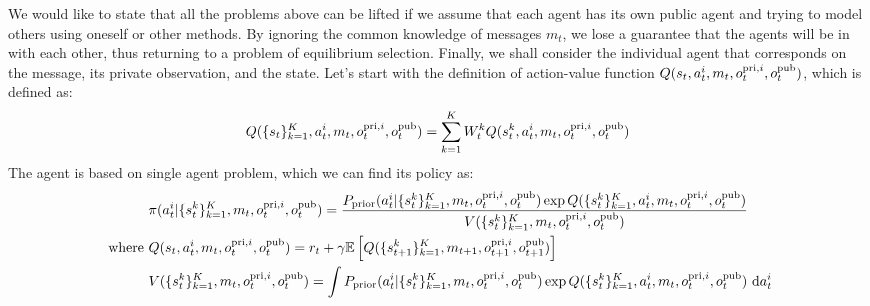 We would like to state that all the problems above can be lifted if we assume that each agent has its own public agent and trying to model others using oneself or other methods. By ignoring the common knowledge of messages $m_t$, we lose a guarantee that the agents will be in  with each other, thus returning to a problem of equilibrium selection. Finally, we shall consider the individual agent that corresponds on the message, its private observation, and the state. Let's start with the definition of action-value function $Q(s_t, a^i_t, m_t, o^{\operatorname{pri}, i}_t, o^{\operatorname{pub}}_t)$, which is defined as:
\begin{equation}
    Q(\{s_t\}^K_{k=1}, a^i_t, m_t, o^{\operatorname{pri}, i}_t, o^{\operatorname{pub}}_t) = \sum^K_{k=1} W^k_t Q(s_t^k, a^i_t, m_t, o^{\operatorname{pri}, i}_t, o^{\operatorname{pub}}_t)
\end{equation}
The agent is based on single agent problem, which we can find its policy as:
\begin{equation}
\begin{aligned}
    &\pi(a^i_t | \{s_t^k\}^K_{k=1}, m_t, o^{\operatorname{pri}, i}_t, o^{\operatorname{pub}}_t) = \frac{P_{\text{prior}}(a^i_t | \{s_t^k\}^K_{k=1}, m_t, o^{\operatorname{pri}, i}_t, o^{\operatorname{pub}}_t)\exp{Q(\{s_t^k\}^K_{k=1}, a^i_t, m_t, o^{\operatorname{pri}, i}_t, o^{\operatorname{pub}}_t)}}{V(\{s_t^k\}^K_{k=1}, m_t, o^{\operatorname{pri}, i}_t, o^{\operatorname{pub}}_t)} \\
    \text{ where }&Q(s_t, a^i_t, m_t, o^{\operatorname{pri}, i}_t, o^{\operatorname{pub}}_t) = r_t + \gamma\mathbb{E}\left[ Q(\{s_{t+1}^k\}^K_{k=1}, m_{t+1}, o^{\operatorname{pri}, i}_{t+1}, o^{\operatorname{pub}}_{t+1}) \right] \\
    &V(\{s_t^k\}^K_{k=1}, m_t, o^{\operatorname{pri}, i}_t, o^{\operatorname{pub}}_t) = \int P_{\text{prior}}(a^i_t | \{s_t^k\}^K_{k=1}, m_t, o^{\operatorname{pri}, i}_t, o^{\operatorname{pub}}_t)\exp{Q(\{s_t^k\}^K_{k=1}, a^i_t, m_t, o^{\operatorname{pri}, i}_t, o^{\operatorname{pub}}_t)} \ \mathrm{d} a^i_t
\end{aligned}
\end{equation}
